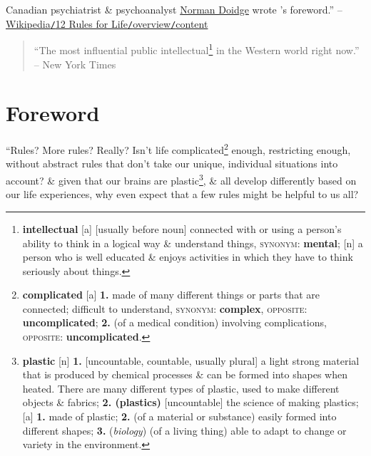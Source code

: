 \documentclass[oneside]{book}
\numberwithin{equation}{section}
\begin{document}
Canadian psychiatrist \& psychoanalyst \href{https://en.wikipedia.org/wiki/Norman_Doidge}{Norman Doidge} wrote \cite{Peterson2018}'s foreword.'' -- \href{https://en.wikipedia.org/wiki/12_Rules_for_Life#Content}{Wikipedia\texttt{/}12 Rules for Life\texttt{/}overview\texttt{/}content}

\begin{quotation}
	``The most influential public intellectual\footnote{\textbf{intellectual} [a] [usually before noun] connected with or using a person's ability to think in a logical way \& understand things, \textsc{synonym}: \textbf{mental}; [n] a person who is well educated \& enjoys activities in which they have to think seriously about things.} in the Western world right now.'' -- New York Times
\end{quotation}

\section*{Foreword}
``Rules? More rules? Really? Isn't life complicated\footnote{\textbf{complicated} [a] \textbf{1.} made of many different things or parts that are connected; difficult to understand, \textsc{synonym}: \textbf{complex}, \textsc{opposite}: \textbf{uncomplicated}; \textbf{2.} (of a medical condition) involving complications, \textsc{opposite}: \textbf{uncomplicated}.} enough, restricting enough, without abstract rules that don't take our unique, individual situations into account? \& given that our brains are plastic\footnote{\textbf{plastic} [n] \textbf{1.} [uncountable, countable, usually plural] a light strong material that is produced by chemical processes \& can be formed into shapes when heated. There are many different types of plastic, used to make different objects \& fabrics; \textbf{2. (plastics)} [uncountable] the science of making plastics; [a] \textbf{1.} made of plastic; \textbf{2.} (of a material or substance) easily formed into different shapes; \textbf{3.} (\textit{biology}) (of a living thing) able to adapt to change or variety in the environment.}, \& all develop differently based on our life experiences, why even expect that a few rules might be helpful to us all?
\end{document}
